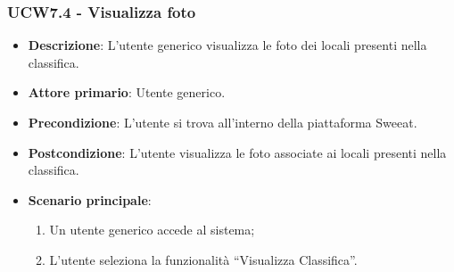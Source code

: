 \subsubsection{UCW7.4 - Visualizza foto}
\begin{itemize}
	\item \textbf{Descrizione}: L'utente generico visualizza le foto dei locali presenti nella classifica.
    \item \textbf{Attore primario}: Utente generico.
    \item \textbf{Precondizione}: L’utente si trova all’interno della piattaforma Sweeat.
    \item \textbf{Postcondizione}: L’utente visualizza le foto associate ai locali presenti nella classifica.
    \item \textbf{Scenario principale}: 
    \begin{enumerate}
        \item Un utente generico accede al sistema;
        \item L’utente seleziona la funzionalità “Visualizza Classifica”.
    \end{enumerate}
\end{itemize}